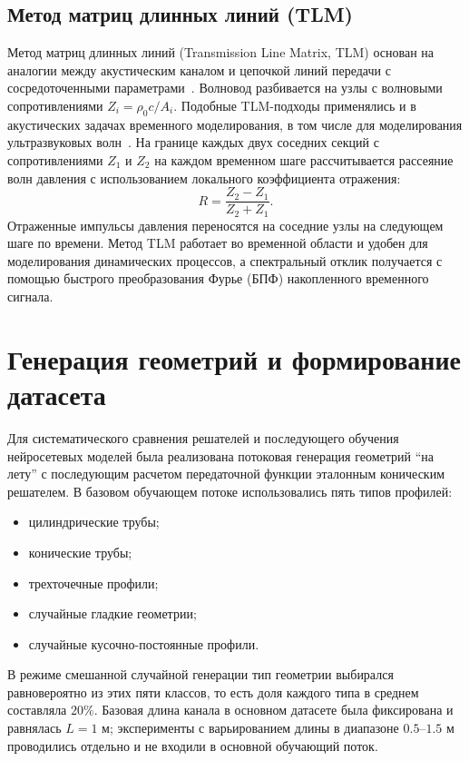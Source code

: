 \subsection{Метод матриц длинных линий (TLM)}
\label{subsec:tlm_solver}

Метод матриц длинных линий (Transmission Line Matrix, TLM) основан на аналогии между акустическим каналом и цепочкой линий передачи с сосредоточенными параметрами~\cite{johns1971,christopoulos1995}. Волновод разбивается на узлы с волновыми сопротивлениями $Z_i = \rho_0 c / A_i$. Подобные TLM-подходы применялись и в акустических задачах временного моделирования, в том числе для моделирования ультразвуковых волн~\cite{ahmadian2001}. На границе каждых двух соседних секций с сопротивлениями $Z_1$ и $Z_2$ на каждом временном шаге рассчитывается рассеяние волн давления с использованием локального коэффициента отражения:
\begin{equation}
    R = \frac{Z_2 - Z_1}{Z_2 + Z_1}.
\end{equation}
Отраженные импульсы давления переносятся на соседние узлы на следующем шаге по времени. Метод TLM работает во временной области и удобен для моделирования динамических процессов, а спектральный отклик получается с помощью быстрого преобразования Фурье (БПФ) накопленного временного сигнала.

\section{Генерация геометрий и формирование датасета}
\label{sec:dataset_generation}

Для систематического сравнения решателей и последующего обучения нейросетевых моделей была реализована потоковая генерация геометрий ``на лету'' с последующим расчетом передаточной функции эталонным коническим решателем. В базовом обучающем потоке использовались пять типов профилей:
\begin{itemize}
    \item цилиндрические трубы;
    \item конические трубы;
    \item трехточечные профили;
    \item случайные гладкие геометрии;
    \item случайные кусочно-постоянные профили.
\end{itemize}

В режиме смешанной случайной генерации тип геометрии выбирался равновероятно из этих пяти классов, то есть доля каждого типа в среднем составляла $20\%$. Базовая длина канала в основном датасете была фиксирована и равнялась $L=1$ м; эксперименты с варьированием длины в диапазоне $0.5$--$1.5$ м проводились отдельно и не входили в основной обучающий поток.

